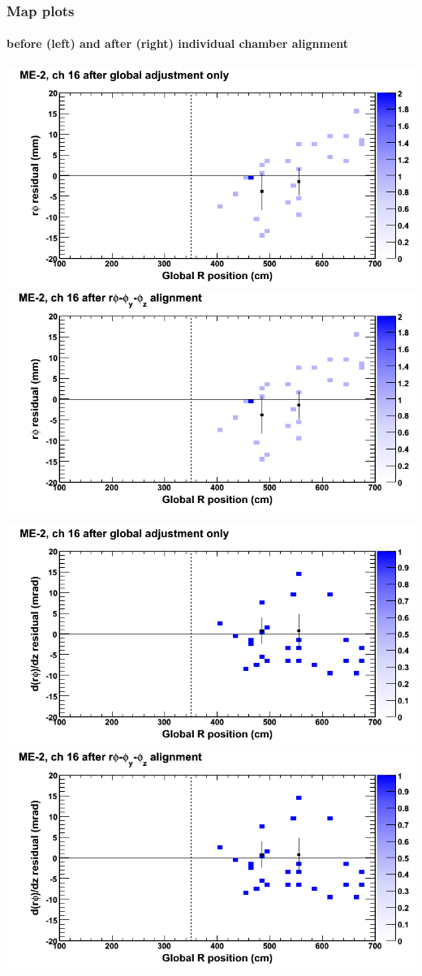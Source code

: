 \documentclass[compress]{beamer}
\begin{document}
\begin{frame}
\frametitle{Map plots}
\framesubtitle{before (left) and after (right) individual chamber alignment}
\includegraphics[width=0.5\linewidth]{ringmapplots_3dof/before_CSCvsr_mem2ch16_x.png} \includegraphics[width=0.5\linewidth]{ringmapplots_3dof/after_CSCvsr_mem2ch16_x.png}

\includegraphics[width=0.5\linewidth]{ringmapplots_3dof/before_CSCvsr_mem2ch16_dxdz.png} \includegraphics[width=0.5\linewidth]{ringmapplots_3dof/after_CSCvsr_mem2ch16_dxdz.png}
\end{frame}
\end{document}
